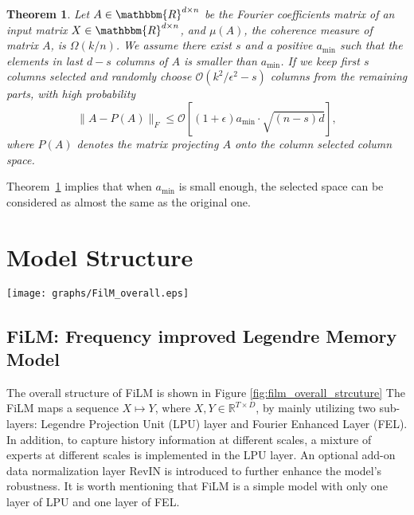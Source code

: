 \documentclass{article}
\newtheorem{theorem}{Theorem}
\def \R {\mathbb{R}}
\begin{document}
\begin{theorem}
\label{thm_Fourier} 
Let $A\in\mathbbm{R}^{d\times n}$ be the Fourier coefficients matrix of an input matrix $X\in\mathbbm{R}^{d\times n}$, and $\mu(A)$, the coherence measure of matrix $A$, is $\Omega(k/n)$. We assume there exist $s$ and  a positive $ a_{\min}$ such that the elements in last $d-s$ columns of $A$ is smaller than $a_{\min}$. If we keep first $s$ columns selected and randomly choose $\mathcal{O}(k^2/\epsilon^2 - s)$ columns from the remaining parts, with high probability
\[
    \|A - P(A)\|_F \leq \mathcal{O}\left[(1 + \epsilon)a_{\min}\cdot\sqrt{(n-s)d}\right],
\]
where  $P(A)$ denotes the matrix projecting $A$ onto the column selected column space.
\end{theorem}
Theorem~\ref{thm_Fourier} implies that when $a_{\min}$ is small enough, the selected space can be considered as almost the same as the original one.












%
 \section{Model Structure}\label{sec_model}
\begin{figure*}[t]
\centering
\texttt{[image: graphs/FilM\_overall.eps]}
\caption{Overall structure of FilM (Frequency improved Legendre Memory Model). LPU: Legendre Projection Unit. LPU\_R: reverse recovery of Legendre Projection. FEL: Frequency Enhanced Layer. RevIn: data normalization block. The input data is first normalized and then project to Legendre Polynomials space (LPU memory $C$). The LPU memory $C$ is processed with FEL and generates the memory $C'$ of output. Finally, $C'$ is reconstructed and denormalized to output series with $\mathrm{LPU}_R$. A multiscale structure is employed to process the input with length $\{T,\ 2T,\ ...\ nT\}$.} 
\label{fig:film_overall_strcuture}
\vskip -0.10in
\end{figure*}

\subsection{FiLM: Frequency improved Legendre Memory Model}\label{sec:model_structure}
The overall structure of FiLM is shown in Figure \ref{fig:film_overall_strcuture}
The FiLM maps a sequence $X \mapsto Y$, where $X, Y \in \R^{T \times D}$, by mainly utilizing two sub-layers: Legendre Projection Unit (LPU) layer and Fourier Enhanced Layer (FEL). In addition, to capture history information at different scales, a mixture of experts at different scales is implemented in the LPU layer. An optional add-on data normalization layer RevIN \cite{reversible} is introduced to further enhance the model's robustness. It is worth mentioning that FiLM is a simple model with only one layer of LPU and one layer of FEL.
\end{document}
